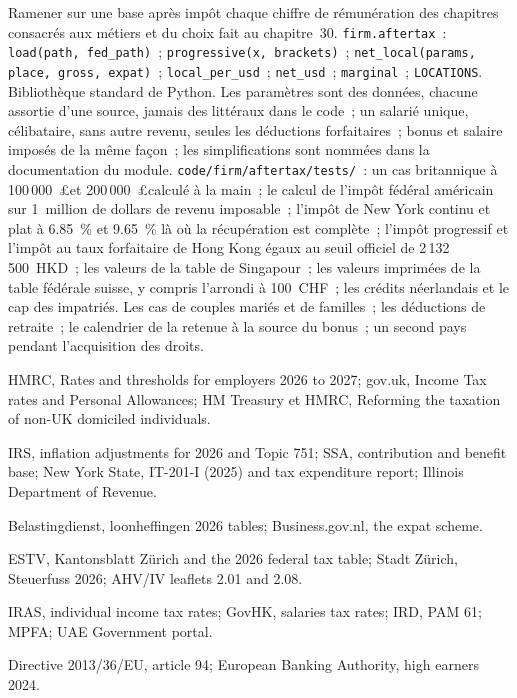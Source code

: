 \begin{build}
 Ramener sur une base après impôt chaque chiffre de rémunération des chapitres consacrés aux métiers et du choix fait au chapitre~30.
 \texttt{firm.aftertax}~: \texttt{load(path, fed\_path)}~; \texttt{progressive(x, brackets)}~;
\texttt{net\_local(params, place, gross, expat)}~; \texttt{local\_per\_usd}~; \texttt{net\_usd}~; \texttt{marginal}~;
\texttt{LOCATIONS}. Bibliothèque standard de Python.
 Les paramètres sont des données, chacune assortie d'une source, jamais des littéraux dans le code~; un salarié unique, célibataire, sans autre revenu,
seules les déductions forfaitaires~; bonus et salaire imposés de la même façon~; les simplifications sont nommées dans la documentation du module.
 \texttt{code/firm/aftertax/tests/}~: un cas britannique à 100\,000~\pounds et 200\,000~\pounds calculé à la main~; le
calcul de l'impôt fédéral américain sur 1~million de dollars de revenu imposable~; l'impôt de New York continu et plat à 6.85~\% et 9.65~\% là où la récupération
est complète~; l'impôt progressif et l'impôt au taux forfaitaire de Hong Kong égaux au seuil officiel de 2\,132\,500~HKD~; les valeurs de
la table de Singapour~; les valeurs imprimées de la table fédérale suisse, y compris l'arrondi à 100~CHF~; les crédits néerlandais et le cap des impatriés.
 Les cas de couples mariés et de familles~; les déductions de retraite~; le calendrier de la retenue à la source du bonus~; un second pays pendant
l'acquisition des droits.
\end{build}

\begin{omsources}
\item HMRC, Rates and thresholds for employers 2026 to 2027; gov.uk, Income Tax rates and Personal Allowances; HM Treasury
et HMRC, Reforming the taxation of non-UK domiciled individuals.
\item IRS, inflation adjustments for 2026 and Topic 751; SSA, contribution and benefit base; New York State, IT-201-I
(2025) and tax expenditure report; Illinois Department of Revenue.
\item Belastingdienst, loonheffingen 2026 tables; Business.gov.nl, the expat scheme.
\item ESTV, Kantonsblatt Zürich and the 2026 federal tax table; Stadt Zürich, Steuerfuss 2026; AHV/IV leaflets 2.01 and
2.08.
\item IRAS, individual income tax rates; GovHK, salaries tax rates; IRD, PAM 61; MPFA; UAE Government portal.
\item Directive 2013/36/EU, article 94; European Banking Authority, high earners 2024.
\end{omsources}

